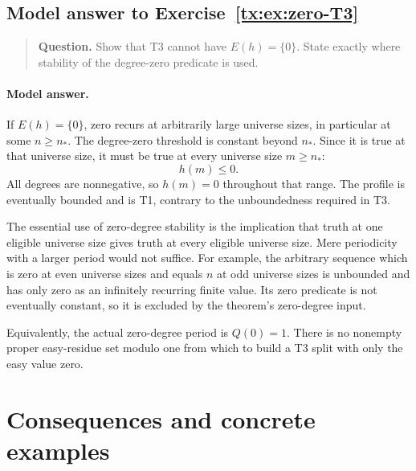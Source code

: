 \begin{samepage}

\subsection*{Model answer to Exercise~\ref{tx:ex:zero-T3}}\label{tx:ans:zero-T3}

\begin{quote}\small\textbf{Question.} Show that T3 cannot have $E(h)=\{0\}$. State exactly where stability of
the degree-zero predicate is used.
\end{quote}

\paragraph{Model answer.}
If \(E(h)=\{0\}\), zero recurs at arbitrarily large universe sizes, in
particular at some \(n\ge n_*\). The degree-zero threshold is
constant beyond \(n_*\). Since it is true at that universe size, it must
be true at every universe size \(m\ge n_*\):
\[
                              h(m)\le0.
\]
All degrees are nonnegative, so \(h(m)=0\) throughout that range.
The profile is eventually bounded and is T1, contrary to the
unboundedness required in T3.
\end{samepage}

The essential use of zero-degree stability is the implication
that truth at one eligible universe size gives truth at every eligible universe size.
Mere periodicity with a larger period would not suffice. For example,
the arbitrary sequence which is zero at even universe sizes and equals \(n\)
at odd universe sizes is unbounded and has only zero as an infinitely recurring
finite value. Its zero predicate is not eventually constant, so it
is excluded by the theorem's zero-degree input.

Equivalently, the actual zero-degree period is \(Q(0)=1\).
There is no nonempty proper easy-residue set modulo one from which
to build a T3 split with only the easy value zero.


\par


\section{Consequences and concrete examples}

